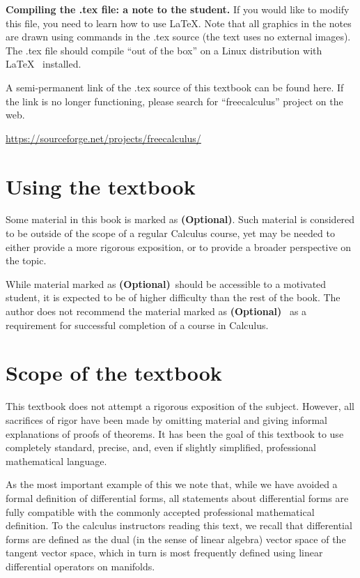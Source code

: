 \documentclass[12pt]{book}
\newcommand{\optionalMaterial}{\textbf{(Optional)}}
\begin{document}
\noindent \textbf{Compiling the .tex file: a note to the student.} If you would like to modify this file, you need to learn how to use \LaTeX. Note that all graphics in the notes are drawn using commands in the .tex source (the text uses no external images). The .tex file should compile ``out of the box'' on a Linux distribution with \LaTeX~ installed.

A semi-permanent link of the .tex source of this textbook can be found here. If the link is no longer functioning, please search for ``freecalculus'' project on the web.

\url{https://sourceforge.net/projects/freecalculus/}

\section*{Using the textbook}

Some material in this book is marked as \optionalMaterial. Such material is considered to be outside of the scope of a regular Calculus course, yet may be needed to either provide a more rigorous exposition, or to provide a broader perspective on the topic.

While material marked as \optionalMaterial ~should be accessible to a motivated student, it is expected to be of higher difficulty than the rest of the book. The author does not recommend the material marked as \optionalMaterial ~ as a requirement for successful completion of a course in Calculus.

\section*{Scope of the textbook}
This textbook does not attempt a rigorous exposition of the subject. However, all sacrifices of rigor have been made by omitting material and giving informal explanations of proofs of theorems. It has been the goal of this textbook to use completely standard, precise, and, even if slightly simplified, professional mathematical language.

As the most important example of this we note that, while we have avoided a formal definition of differential forms, all statements about differential forms are fully compatible with the commonly accepted professional mathematical definition. To the calculus instructors reading this text, we recall that differential forms are defined as the dual (in the sense of linear algebra) vector space of the tangent vector space, which in turn is most frequently defined using linear differential operators on manifolds.
\end{document}
